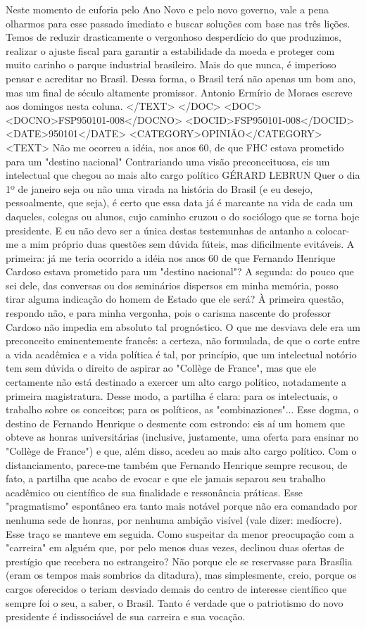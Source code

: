 Neste momento de euforia pelo Ano Novo e pelo novo governo, vale a pena olharmos para esse passado imediato e buscar soluções com base nas três lições. Temos de reduzir drasticamente o vergonhoso desperdício do que produzimos, realizar o ajuste fiscal para garantir a estabilidade da moeda e proteger com muito carinho o parque industrial brasileiro. Mais do que nunca, é imperioso pensar e acreditar no Brasil. Dessa forma, o Brasil terá não apenas um bom ano, mas um final de século altamente promissor.
Antonio Ermírio de Moraes escreve aos domingos nesta coluna.
</TEXT>
</DOC>
<DOC>
<DOCNO>FSP950101-008</DOCNO>
<DOCID>FSP950101-008</DOCID>
<DATE>950101</DATE>
<CATEGORY>OPINIÃO</CATEGORY>
<TEXT>
Não me ocorreu a idéia, nos anos 60, de que FHC estava prometido para um "destino nacional" 
Contrariando uma visão preconceituosa, eis um intelectual que chegou ao mais alto cargo político 
GÉRARD LEBRUN 
Quer o dia 1º de janeiro seja ou não uma virada na história do Brasil (e eu desejo, pessoalmente, que seja), é certo que essa data já é marcante na vida de cada um daqueles, colegas ou alunos, cujo caminho cruzou o do sociólogo que se torna hoje presidente. E eu não devo ser a única destas testemunhas de antanho a colocar-me a mim próprio duas questões sem dúvida fúteis, mas dificilmente evitáveis. A primeira: já me teria ocorrido a idéia nos anos 60 de que Fernando Henrique Cardoso estava prometido para um "destino nacional"? A segunda: do pouco que sei dele, das conversas ou dos seminários dispersos em minha memória, posso tirar alguma indicação do homem de Estado que ele será?
À primeira questão, respondo não, e para minha vergonha, pois o carisma nascente do professor Cardoso não impedia em absoluto tal prognóstico. O que me desviava dele era um preconceito eminentemente francês: a certeza, não formulada, de que o corte entre a vida acadêmica e a vida política é tal, por princípio, que um intelectual notório tem sem dúvida o direito de aspirar ao "Collège de France", mas que ele certamente não está destinado a exercer um alto cargo político, notadamente a primeira magistratura. Desse modo, a partilha é clara: para os intelectuais, o trabalho sobre os conceitos; para os políticos, as "combinaziones"... Esse dogma, o destino de Fernando Henrique o desmente com estrondo: eis aí um homem que obteve as honras universitárias (inclusive, justamente, uma oferta para ensinar no "Collège de France") e que, além disso, acedeu ao mais alto cargo político. Com o distanciamento, parece-me também que Fernando Henrique sempre recusou, de fato, a partilha que acabo de evocar e que ele jamais separou seu trabalho acadêmico ou científico de sua finalidade e ressonância práticas. Esse "pragmatismo" espontâneo era tanto mais notável porque não era comandado por nenhuma sede de honras, por nenhuma ambição visível (vale dizer: medíocre). Esse traço se manteve em seguida. Como suspeitar da menor preocupação com a "carreira" em alguém que, por pelo menos duas vezes, declinou duas ofertas de prestígio que recebera no estrangeiro? Não porque ele se reservasse para Brasília (eram os tempos mais sombrios da ditadura), mas simplesmente, creio, porque os cargos oferecidos o teriam desviado demais do centro de interesse científico que sempre foi o seu, a saber, o Brasil. Tanto é verdade que o patriotismo do novo presidente é indissociável de sua carreira e sua vocação.
